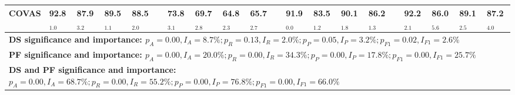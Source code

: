 \begin{table*}[!t]
{\begin{tabular}{llllllllllllllllllll}
\textbf{COVAS}                  & \textbf{92.8$_{1.0}$} & \textbf{87.9$_{3.2}$} & \textbf{89.5$_{1.1}$} & \textbf{88.5$_{2.0}$} &  & 73.8$_{3.1}$          & 69.7$_{2.8}$          & 64.8$_{2.3}$          & 65.7$_{2.7}$          &  & 91.9$_{0.0}$   & 83.5$_{1.2}$   & 90.1$_{1.8}$   & 86.2$_{1.3}$    &  & 92.2$_{2.1}$   & 86.0$_{5.6}$   & 89.1$_{2.5}$   & 87.2$_{4.0}$    \\ \midrule
\multicolumn{20}{l}{\textbf{DS significance and importance: $p_A=0.00, I_A=8.7\%; p_R=0.13, I_R=2.0\%; p_P=0.05, I_P=3.2\%; p_{F1}=0.02, I_{F1}=2.6\%$}}                                                                                                                                                                                                                           \\
\multicolumn{20}{l}{\textbf{PF significance and importance: $p_A=0.00, I_A=20.0\%; p_R=0.00, I_R=34.3\%; p_P=0.00, I_P=17.8\%; p_{F1}=0.00, I_{F1}=25.7\%$}}                                                                                                                                                                                                                       \\
\multicolumn{20}{l}{\textbf{DS and PF significance and importance: $p_A=0.00, I_A=68.7\%; p_R=0.00, I_R=55.2\%; p_P=0.00, I_P=76.8\%; p_{F1}=0.00, I_{F1}=66.0\%$}}                                                                                                                                                                                                                \\ \bottomrule
\end{tabular}%
}
\end{table*}



